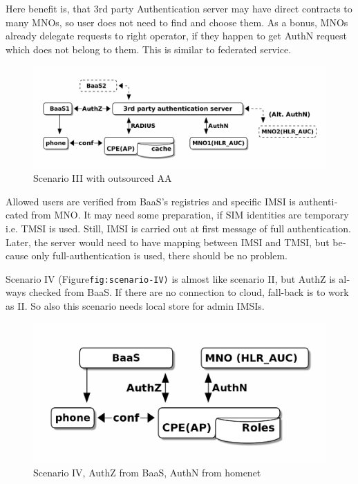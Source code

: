 \documentclass[12pt,a4paper,english]{tutthesis}
\begin{document}
\begin{otherlanguage}{english}
Here benefit is, that 3rd party Authentication server may have direct
contracts to many MNOs, so user does not need to find and choose
them. As a bonus,  MNOs already delegate requests to right operator, if
they happen to get AuthN request which does not belong to them.
This is similar to federated service.

\begin{figure}[htb]
\centering
\includegraphics[width=.9\linewidth]{scenIII.png}
\caption{\label{fig:scenario-III}Scenario III with outsourced AA}
\end{figure}

Allowed users are verified from BaaS's registries and specific IMSI is
authenticated from MNO.  It may need some preparation, if SIM
identities are temporary i.e. TMSI is used.  Still, IMSI is carried out at first message
of full authentication. Later, the server would need to have mapping
between IMSI and TMSI, but because only full-authentication is used,
there should be no problem.


\label{scenario-iv} 


Scenario IV (Figure\texttt{fig:scenario-IV)} is almost like scenario II, but
AuthZ is always checked from BaaS. If there are no connection to
cloud, fall-back is to work as II. So also this scenario needs local
store for admin IMSIs.

\begin{figure}[htb]
\centering
\includegraphics[width=.9\linewidth]{scenIV.png}
\caption{\label{fig:scenario-IV}Scenario IV, AuthZ from BaaS, AuthN from homenet}
\end{figure}


\end{otherlanguage}
\end{document}
